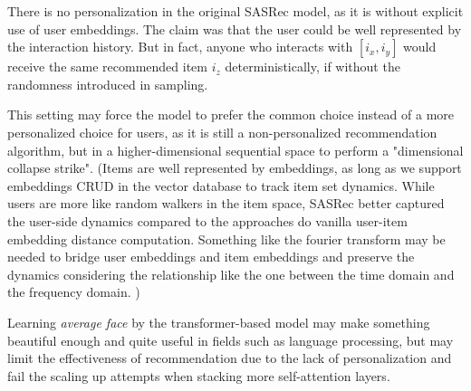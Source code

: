 \documentclass{article}
\begin{document}

There is no personalization in the original SASRec\cite{sasrec} model, as it is without explicit use of user embeddings. The claim was that the user could be well represented by the interaction history. But in fact, anyone who interacts with $[i_x, i_y]$ would receive the same recommended item $i_z$ deterministically,
if without the randomness introduced in sampling.

This setting may force the model to prefer the common choice instead of a more personalized choice for users, as it is still a non-personalized recommendation algorithm, but in a higher-dimensional sequential space to
perform a "dimensional collapse strike".
(Items are well represented by embeddings, as long as we support embeddings CRUD
in the vector database to track item
set dynamics.
While users are more like random walkers in the item space,
SASRec better captured the user-side dynamics
compared to the approaches do vanilla user-item embedding distance computation.
Something like the fourier transform may be needed
to bridge user embeddings and item embeddings
and preserve the dynamics considering the relationship
like the one between the time domain and the frequency domain.
)

Learning \emph{average face} by the transformer-based model may make something beautiful enough and quite useful in fields such as language processing, but may limit the effectiveness of recommendation due to the lack of personalization and fail the scaling up attempts when stacking more self-attention layers. 







\end{document}
